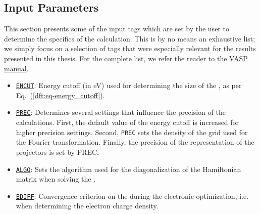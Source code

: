 \begin{refsection}
\subsection{Input Parameters} \label{appendix:sec-input} 
 
This section presents some of the input tags which are set by 
the user to determine the specifics of the calculation. This is by no means 
an exhaustive list; we simply focus on a selection of tags that were 
especially relevant for the results presented in this thesis. For the complete 
list, we refer the reader to the 
\href{https://www.vasp.at/wiki/index.php/The_VASP_Manual}{VASP manual}. 
 
\begin{itemize} 
 
 \label{appendix:sec-ENCUT} 
\item \href{https://cms.mpi.univie.ac.at/wiki/index.php/ENCUT}{\texttt{ENCUT}}: 
Energy cutoff (in \si{\electronvolt}) used for determining the size of the 
, as per 
Eq.~(\ref{dft:eq-energy_cutoff}).
 
 \label{appendix:sec-PREC} 
\item \href{https://cms.mpi.univie.ac.at/wiki/index.php/PREC}{\texttt{PREC}}: 
Determines several settings that influence the precision of the calculations. 
First, the default value of the energy cutoff is increased for higher precision 
settings. Second, \texttt{PREC} sets the density of the grid used for the 
Fourier transformation. Finally, the precision of the representation of the 
 projectors is set by PREC.
 
 \label{appendix:sec-ALGO} 
\item \href{https://cms.mpi.univie.ac.at/wiki/index.php/ALGO}{\texttt{ALGO}}: 
Sets the algorithm used for the diagonalization of the Hamiltonian matrix 
when solving the .

 \label{appendix:sec-EDIFF} 
\item \href{https://cms.mpi.univie.ac.at/wiki/index.php/EDIFF}{\texttt{EDIFF}}: 
Convergence criterion on the  
during the electronic optimization, i.e. when determining the electron charge 
density.
 

\end{itemize}
\end{refsection}
